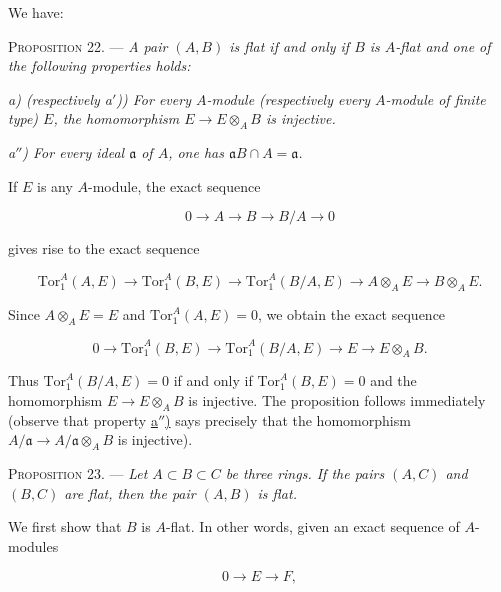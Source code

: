 We have:

\textsc{Proposition 22}. --- \emph{A pair $(A,B)$ is
flat if and only if $B$ is $A$-flat and one of the following properties
holds:}

\emph{a) (respectively a$'$)) For every
$A$-module (respectively every $A$-module of finite type) $E$, the
homomorphism $E\to E\otimes_AB$ is injective.}

\emph{a$''$) For every ideal $\mathfrak{a}$
of $A$, one has $\mathfrak{a}B\cap A=\mathfrak{a}$.}

If $E$ is any $A$-module, the exact sequence

\begin{equation*}
0\longrightarrow A\longrightarrow B\longrightarrow B/A\longrightarrow0
\end{equation*}

gives rise to the exact sequence

\begin{equation*}
\mathrm{Tor}_1^A(A,E)\longrightarrow
\mathrm{Tor}_1^A(B,E)\longrightarrow
\mathrm{Tor}_1^A(B/A,E)\longrightarrow
A\otimes_AE\longrightarrow B\otimes_AE.
\end{equation*}

Since $A\otimes_AE=E$ and $\mathrm{Tor}_1^A(A,E)=0$, we obtain the exact
sequence

\begin{equation*}
0\longrightarrow\mathrm{Tor}_1^A(B,E)\longrightarrow
\mathrm{Tor}_1^A(B/A,E)\longrightarrow E\longrightarrow E\otimes_AB.
\end{equation*}

Thus $\mathrm{Tor}_1^A(B/A,E)=0$ if and only if
$\mathrm{Tor}_1^A(B,E)=0$ and the homomorphism $E\to E\otimes_AB$ is
injective. The proposition follows immediately (observe that property
\hyperref[gaga:prop:22:item:aa]{a$''$)} says precisely that the homomorphism
$A/\mathfrak{a}\to A/\mathfrak{a}\otimes_AB$ is injective).

\textsc{Proposition 23}. --- \emph{Let
$A\subset B\subset C$ be three rings. If the pairs $(A,C)$ and $(B,C)$ are
flat, then the pair $(A,B)$ is flat.}

We first show that $B$ is $A$-flat. In other words, given an exact sequence of
$A$-modules

\begin{equation*}
0\longrightarrow E\longrightarrow F,
\end{equation*}

